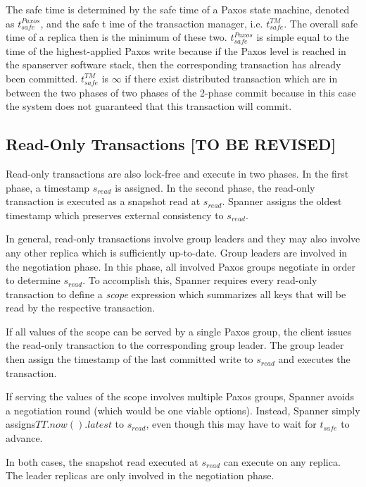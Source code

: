 \documentclass[onecolumn, a4paper, 10pt]{article}
\newcommand{\tbr}{{\color{red}\textbf{[TO BE REVISED]}}}
\begin{document}
The safe time is determined by the safe time of a Paxos state machine, denoted
as $t_{safe}^{Paxos}$, and the safe t ime of the transaction manager, i.e.
$t_{safe}^{TM}$. The overall safe time of a replica then is the minimum of
these two. $t_{safe}^{Paxos}$ is simple equal to the time of the highest-applied
Paxos write because if the Paxos level is reached in the spanserver software stack,
then the corresponding transaction has already been committed. $t_{safe}^{TM}$
is $\infty$ if there exist distributed transaction which are in between the two
phases of two phases of the 2-phase commit because in this case the system does
not guaranteed that this transaction will commit.

\subsection{Read-Only Transactions \tbr}
\label{subsec:read-only-transactions}

Read-only transactions are also lock-free and execute in two phases. In the first
phase, a timestamp $s_{read}$ is assigned. In the second phase, the read-only
transaction is executed as a snapshot read at $s_{read}$. Spanner assigns
the oldest timestamp which preserves external consistency to $s_{read}$.

In general, read-only transactions involve group leaders and they may also involve
any other replica which is sufficiently up-to-date. Group leaders are involved
in the negotiation phase. In this phase, all involved Paxos groups negotiate in
order to determine $s_{read}$. To accomplish this, Spanner requires every
read-only transaction to define a \emph{scope} expression which summarizes all
keys that will be read by the respective transaction.

If all values of the scope can be served by a single Paxos group, the client
issues the read-only transaction to the corresponding group leader. The group
leader then assign the timestamp of the last committed write to $s_{read}$ and
executes the transaction.

If serving the values of the scope involves multiple Paxos groups, Spanner avoids
a negotiation round (which would be one viable options). Instead, Spanner simply
assigns$TT.now().latest$ to $s_{read}$, even though this may have to wait for
$t_{safe}$ to advance.

In both cases, the snapshot read executed at $s_{read}$ can execute on any
replica. The leader replicas are only involved in the negotiation phase.
\end{document}
